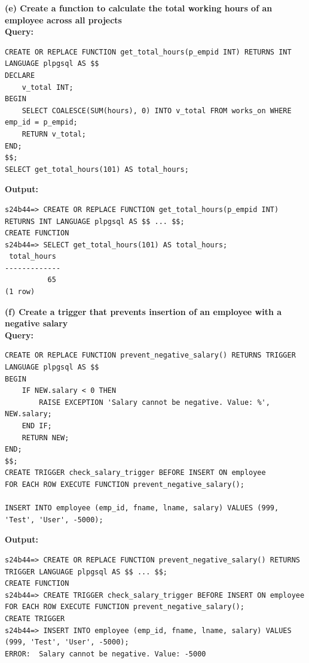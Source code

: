 \documentclass[12pt, a4paper]{article}
\begin{document}
\textbf{(e) Create a function to calculate the total working hours of an employee across all projects}\\
\textbf{Query:}
\begin{lstlisting}
CREATE OR REPLACE FUNCTION get_total_hours(p_empid INT) RETURNS INT LANGUAGE plpgsql AS $$
DECLARE
    v_total INT;
BEGIN
    SELECT COALESCE(SUM(hours), 0) INTO v_total FROM works_on WHERE emp_id = p_empid;
    RETURN v_total;
END;
$$;
SELECT get_total_hours(101) AS total_hours;
\end{lstlisting}
\textbf{Output:}
\begin{lstlisting}[style=terminal]
s24b44=> CREATE OR REPLACE FUNCTION get_total_hours(p_empid INT) RETURNS INT LANGUAGE plpgsql AS $$ ... $$;
CREATE FUNCTION
s24b44=> SELECT get_total_hours(101) AS total_hours;
 total_hours 
-------------
          65
(1 row)
\end{lstlisting}

\textbf{(f) Create a trigger that prevents insertion of an employee with a negative salary}\\
\textbf{Query:}
\begin{lstlisting}
CREATE OR REPLACE FUNCTION prevent_negative_salary() RETURNS TRIGGER LANGUAGE plpgsql AS $$
BEGIN
    IF NEW.salary < 0 THEN
        RAISE EXCEPTION 'Salary cannot be negative. Value: %', NEW.salary;
    END IF;
    RETURN NEW;
END;
$$;
CREATE TRIGGER check_salary_trigger BEFORE INSERT ON employee
FOR EACH ROW EXECUTE FUNCTION prevent_negative_salary();

INSERT INTO employee (emp_id, fname, lname, salary) VALUES (999, 'Test', 'User', -5000);
\end{lstlisting}
\textbf{Output:}
\begin{lstlisting}[style=terminal]
s24b44=> CREATE OR REPLACE FUNCTION prevent_negative_salary() RETURNS TRIGGER LANGUAGE plpgsql AS $$ ... $$;
CREATE FUNCTION
s24b44=> CREATE TRIGGER check_salary_trigger BEFORE INSERT ON employee FOR EACH ROW EXECUTE FUNCTION prevent_negative_salary();
CREATE TRIGGER
s24b44=> INSERT INTO employee (emp_id, fname, lname, salary) VALUES (999, 'Test', 'User', -5000);
ERROR:  Salary cannot be negative. Value: -5000
\end{lstlisting}
\end{document}
